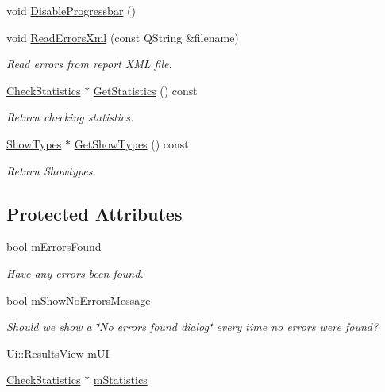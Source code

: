 \begin{DoxyCompactItemize}
void \hyperlink{class_results_view_aa9086cbea992f9ffe4f091946cc7bbf0}{Disable\-Progressbar} ()
\item 
void \hyperlink{class_results_view_ac4686086f3f04b293b219dd62955795c}{Read\-Errors\-Xml} (const Q\-String \&filename)
\begin{DoxyCompactList}\small\item\em Read errors from report X\-M\-L file. \end{DoxyCompactList}\item 
\hyperlink{class_check_statistics}{Check\-Statistics} $\ast$ \hyperlink{class_results_view_a35663429f191af1dafa821cff520e17f}{Get\-Statistics} () const 
\begin{DoxyCompactList}\small\item\em Return checking statistics. \end{DoxyCompactList}\item 
\hyperlink{class_show_types}{Show\-Types} $\ast$ \hyperlink{class_results_view_ab78a5b9a06d8000e4edd0239a2402654}{Get\-Show\-Types} () const 
\begin{DoxyCompactList}\small\item\em Return Showtypes. \end{DoxyCompactList}\end{DoxyCompactItemize}
\subsection*{Protected Attributes}
\begin{DoxyCompactItemize}
\item 
bool \hyperlink{class_results_view_afbb19855b2d5c8607e94abafef54d0df}{m\-Errors\-Found}
\begin{DoxyCompactList}\small\item\em Have any errors been found. \end{DoxyCompactList}\item 
bool \hyperlink{class_results_view_a51d04dc3d41eccb2185d9ab040ec60a0}{m\-Show\-No\-Errors\-Message}
\begin{DoxyCompactList}\small\item\em Should we show a \char`\"{}\-No errors found dialog\char`\"{} every time no errors were found? \end{DoxyCompactList}\item 
Ui\-::\-Results\-View \hyperlink{class_results_view_a69707109fdfa05850933fac204462c6e}{m\-U\-I}
\item 
\hyperlink{class_check_statistics}{Check\-Statistics} $\ast$ \hyperlink{class_results_view_a8435cbf011fd46daa4173a05c98af4e5}{m\-Statistics}
\end{DoxyCompactItemize}


